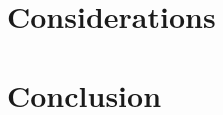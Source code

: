 \documentclass[conference]{IEEEtran}
\begin{document}
\section{Considerations}
\label{considerations}
\section{Conclusion}
\label{conclusion}



\newpage


% 
% 
% 
% 
\end{document}
